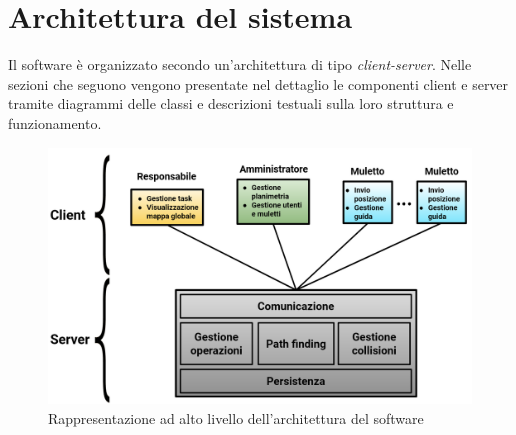 \section{Architettura del sistema}

Il software è organizzato secondo un'architettura di tipo \textit{client-server}. Nelle sezioni che seguono vengono presentate nel dettaglio le componenti client e server tramite diagrammi delle classi e descrizioni testuali sulla loro struttura e funzionamento.

\begin{figure}[H]
	\centering
	\includegraphics[scale=0.34]{res/images/architettura_complessiva.png}
	\caption{Rappresentazione ad alto livello dell'architettura del software}
\end{figure}













